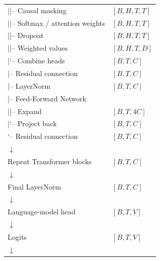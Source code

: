 \begin{longtable}{@{}p{}@{}l@{}}
\hspace*{2em}|\hspace*{3em}|-- Causal masking & \([B,H,T,T]\) \\
\hspace*{2em}|\hspace*{3em}|-- Softmax / attention weights & \([B,H,T,T]\) \\
\hspace*{2em}|\hspace*{3em}|-- Dropout & \([B,H,T,T]\) \\
\hspace*{2em}|\hspace*{3em}|-- Weighted values & \([B,H,T,D]\) \\
\hspace*{2em}|\hspace*{3em}`-- Combine heads & \([B,T,C]\) \\
\hspace*{2em}|-- Residual connection & \([B,T,C]\) \\
\hspace*{2em}|-- LayerNorm & \([B,T,C]\) \\
\hspace*{2em}|-- Feed-Forward Network & \\
\hspace*{2em}|\hspace*{3em}|-- Expand & \([B,T,4C]\) \\
\hspace*{2em}|\hspace*{3em}`-- Project back & \([B,T,C]\) \\
\hspace*{2em}`-- Residual connection & \([B,T,C]\) \\
\hspace*{2em}\(\downarrow\) & \\
Repeat Transformer blocks & \([B,T,C]\) \\
\hspace*{2em}\(\downarrow\) & \\
Final LayerNorm & \([B,T,C]\) \\
\hspace*{2em}\(\downarrow\) & \\
Language-model head & \([B,T,V]\) \\
\hspace*{2em}\(\downarrow\) & \\
Logits & \([B,T,V]\) \\
\hspace*{2em}\(\downarrow\) & \\

\end{longtable}
